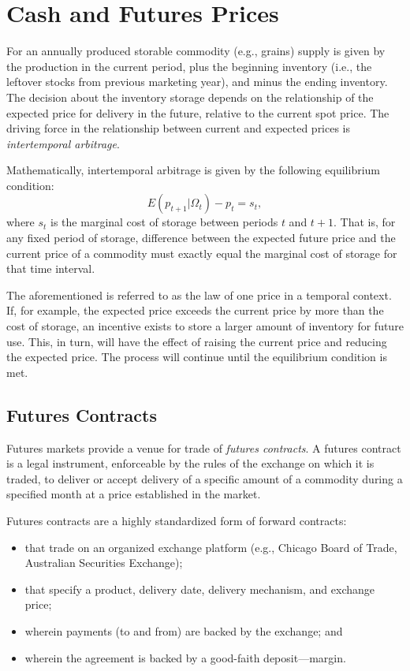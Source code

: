 \documentclass[
  oneside]{book}
\providecommand{\tightlist}{%
  \setlength{\itemsep}{0pt}\setlength{\parskip}{0pt}}
\begin{document}
\hypertarget{cash-and-futures-prices}{%
\chapter{Cash and Futures Prices}\label{cash-and-futures-prices}}

For an annually produced storable commodity (e.g., grains) supply is given by the production in the current period, plus the beginning inventory (i.e., the leftover stocks from previous marketing year), and minus the ending inventory. The decision about the inventory storage depends on the relationship of the expected price for delivery in the future, relative to the current spot price. The driving force in the relationship between current and expected prices is \emph{intertemporal arbitrage}.

Mathematically, intertemporal arbitrage is given by the following equilibrium condition: \[E\left(p_{t+1}|\Omega_t\right)-p_{t} = s_t,\] where \(s_t\) is the marginal cost of storage between periods \(t\) and \(t+1\). That is, for any fixed period of storage, difference between the expected future price and the current price of a commodity must exactly equal the marginal cost of storage for that time interval.

The aforementioned is referred to as the law of one price in a temporal context. If, for example, the expected price exceeds the current price by more than the cost of storage, an incentive exists to store a larger amount of inventory for future use. This, in turn, will have the effect of raising the current price and reducing the expected price. The process will continue until the equilibrium condition is met.

\hypertarget{futures-contracts}{%
\section{Futures Contracts}\label{futures-contracts}}

Futures markets provide a venue for trade of \emph{futures contracts}. A futures contract is a legal instrument, enforceable by the rules of the exchange on which it is traded, to deliver or accept delivery of a specific amount of a commodity during a specified month at a price established in the market.

Futures contracts are a highly standardized form of forward contracts:

\begin{itemize}
\tightlist
\item
  that trade on an organized exchange platform (e.g., Chicago Board of Trade, Australian Securities Exchange);
\item
  that specify a product, delivery date, delivery mechanism, and exchange price;
\item
  wherein payments (to and from) are backed by the exchange; and
\item
  wherein the agreement is backed by a good-faith deposit---margin.
\end{itemize}
\end{document}
